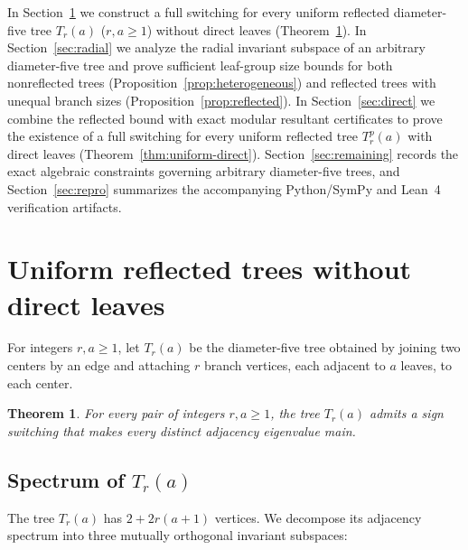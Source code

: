 \documentclass[11pt]{article}
\theoremstyle{plain}
\newtheorem{theorem}{Theorem}[section]
\theoremstyle{remark}
\begin{document}
In Section~\ref{sec:uniform} we construct a full switching for every uniform
reflected diameter-five tree $T_r(a)$ ($r,a \geq 1$) without direct leaves
(Theorem~\ref{thm:uniform}). In Section~\ref{sec:radial} we analyze the radial
invariant subspace of an arbitrary diameter-five tree and prove sufficient
leaf-group size bounds for both nonreflected trees
(Proposition~\ref{prop:heterogeneous}) and reflected trees with unequal branch
sizes (Proposition~\ref{prop:reflected}). In Section~\ref{sec:direct} we combine
the reflected bound with exact modular resultant certificates to prove the
existence of a full switching for every uniform reflected tree $T_r^p(a)$ with
direct leaves (Theorem~\ref{thm:uniform-direct}). Section~\ref{sec:remaining}
records the exact algebraic constraints governing arbitrary diameter-five trees,
and Section~\ref{sec:repro} summarizes the accompanying Python/SymPy and Lean~4
verification artifacts.

\section{Uniform reflected trees without direct leaves}\label{sec:uniform}

For integers $r,a \geq 1$, let $T_r(a)$ be the diameter-five tree obtained by
joining two centers by an edge and attaching $r$ branch vertices, each adjacent
to $a$ leaves, to each center.

\begin{theorem}\label{thm:uniform}
For every pair of integers $r,a\geq 1$, the tree $T_r(a)$ admits a sign
switching that makes every distinct adjacency eigenvalue main.
\end{theorem}

\subsection{Spectrum of \texorpdfstring{$T_r(a)$}{T\_r(a)}}\label{sec:spectrum-tra}

The tree $T_r(a)$ has $2 + 2r(a+1)$ vertices. We decompose its adjacency
spectrum into three mutually orthogonal invariant subspaces:
\end{document}
